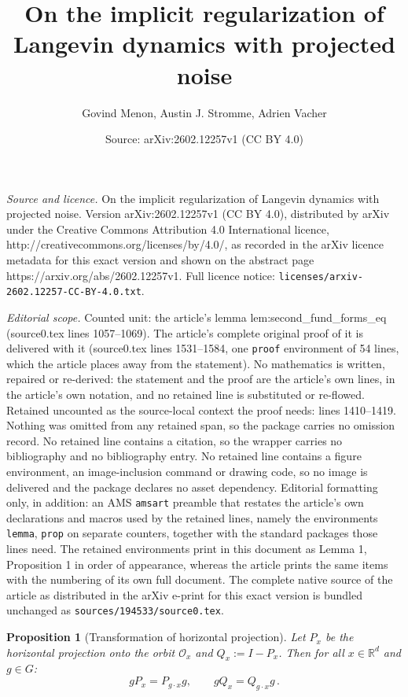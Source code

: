\documentclass[10pt,a4paper]{amsart}
\title{On the implicit regularization of Langevin dynamics with projected noise}
\author{Govind Menon, Austin J. Stromme, Adrien Vacher}
\date{Source: arXiv:2602.12257v1 (CC BY 4.0)}
\newtheorem{prop}{Proposition}
\newcommand\mc{\mathcal}
\begin{document}
\maketitle

\noindent\emph{Source and licence.} On the implicit regularization of Langevin dynamics with projected noise. Version arXiv:2602.12257v1 (CC BY 4.0), distributed by arXiv under the Creative Commons Attribution 4.0 International licence, http://creativecommons.org/licenses/by/4.0/, as recorded in the arXiv licence metadata for this exact version and shown on the abstract page https://arxiv.org/abs/2602.12257v1. Full licence notice: \texttt{licenses/arxiv-2602.12257-CC-BY-4.0.txt}.\par\smallskip

\noindent\textit{Editorial scope.} Counted unit: the article's lemma lem:second\_fund\_forms\_eq (source0.tex lines 1057--1069). The article's complete original proof of it is delivered with it (source0.tex lines 1531--1584, one \texttt{proof} environment of 54 lines, which the article places away from the statement). No mathematics is written, repaired or re-derived: the statement and the proof are the article's own lines, in the article's own notation, and no retained line is substituted or re-flowed.  Retained uncounted as the source-local context the proof needs: lines 1410--1419.  Nothing was omitted from any retained span, so the package carries no omission record.  No retained line contains a citation, so the wrapper carries no bibliography and no bibliography entry.  No retained line contains a figure environment, an image-inclusion command or drawing code, so no image is delivered and the package declares no asset dependency.  Editorial formatting only, in addition: an AMS \texttt{amsart} preamble that restates the article's own declarations and macros used by the retained lines, namely the environments \texttt{lemma}, \texttt{prop} on separate counters, together with the standard packages those lines need.  The retained environments print in this document as Lemma 1, Proposition 1 in order of appearance, whereas the article prints the same items with the numbering of its own full document.  The complete native source of the article as distributed in the arXiv e-print for this exact version is bundled unchanged as \texttt{sources/194533/source0.tex}.
\begin{prop}[Transformation of horizontal projection]
\label{prop:horizontal_proj}
    Let $P_x$ be the horizontal projection onto the 
    orbit $\mc O_x$ and $Q_x := I - P_x$.
    Then for all $x\in \mathbb{R}^d$ and $g \in G$:
    $$
 gP_x = P_{g\cdot x}g, \quad \quad 
    gQ_x = Q_{g\cdot x} g\,.
    $$
\end{prop}
\end{document}
